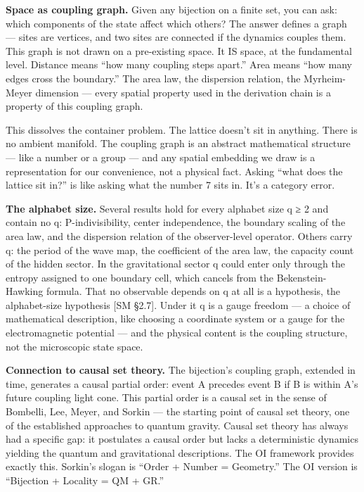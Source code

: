 \documentclass[
]{article}
\begin{document}
\textbf{Space as coupling graph.} Given any bijection on a finite set,
you can ask: which components of the state affect which others? The
answer defines a graph --- sites are vertices, and two sites are
connected if the dynamics couples them. This graph is not drawn on a
pre-existing space. It IS space, at the fundamental level. Distance
means ``how many coupling steps apart.'' Area means ``how many edges
cross the boundary.'' The area law, the dispersion relation, the
Myrheim-Meyer dimension --- every spatial property used in the
derivation chain is a property of this coupling graph.

This dissolves the container problem. The lattice doesn't sit in
anything. There is no ambient manifold. The coupling graph is an
abstract mathematical structure --- like a number or a group --- and any
spatial embedding we draw is a representation for our convenience, not a
physical fact. Asking ``what does the lattice sit in?'' is like asking
what the number 7 sits in. It's a category error.

\textbf{The alphabet size.} Several results hold for every alphabet size
q ≥ 2 and contain no q: P-indivisibility, center independence, the
boundary scaling of the area law, and the dispersion relation of the
observer-level operator. Others carry q: the period of the wave map, the
coefficient of the area law, the capacity count of the hidden sector. In
the gravitational sector q could enter only through the entropy assigned
to one boundary cell, which cancels from the Bekenstein-Hawking formula.
That no observable depends on q at all is a hypothesis, the
alphabet-size hypothesis {[}SM §2.7{]}. Under it q is a gauge freedom
--- a choice of mathematical description, like choosing a coordinate
system or a gauge for the electromagnetic potential --- and the physical
content is the coupling structure, not the microscopic state space.

\textbf{Connection to causal set theory.} The bijection's coupling
graph, extended in time, generates a causal partial order: event A
precedes event B if B is within A's future coupling light cone. This
partial order is a causal set in the sense of Bombelli, Lee, Meyer, and
Sorkin --- the starting point of causal set theory, one of the
established approaches to quantum gravity. Causal set theory has always
had a specific gap: it postulates a causal order but lacks a
deterministic dynamics yielding the quantum and gravitational
descriptions. The OI framework provides exactly this. Sorkin's slogan is
``Order + Number = Geometry.'' The OI version is ``Bijection + Locality
= QM + GR.''
\end{document}
